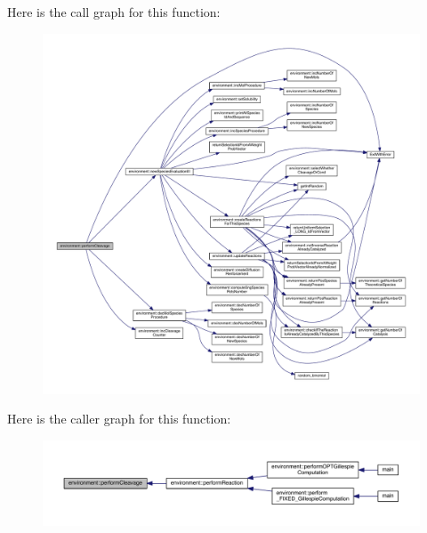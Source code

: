 Here is the call graph for this function\-:
\nopagebreak
\begin{figure}[H]
\begin{center}
\leavevmode
\includegraphics[width=350pt]{a00014_aa4ed307a123c402166cfc7f6ed99043a_cgraph}
\end{center}
\end{figure}




Here is the caller graph for this function\-:
\nopagebreak
\begin{figure}[H]
\begin{center}
\leavevmode
\includegraphics[width=350pt]{a00014_aa4ed307a123c402166cfc7f6ed99043a_icgraph}
\end{center}
\end{figure}


